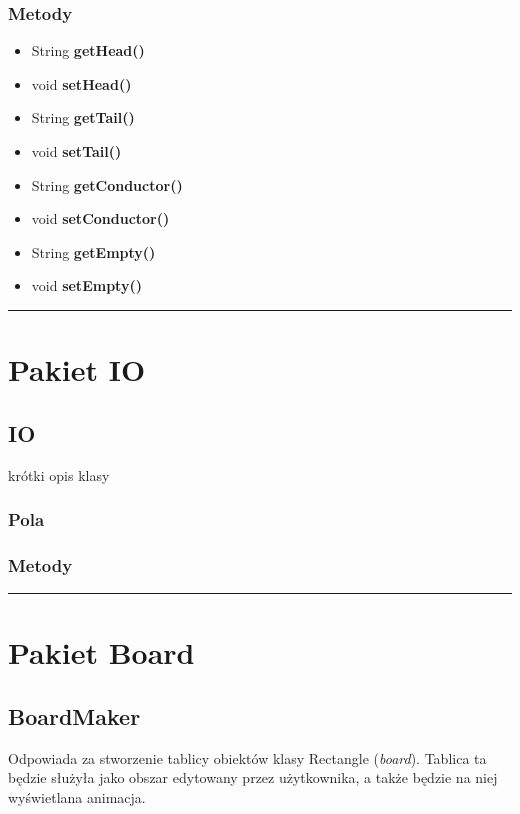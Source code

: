 \documentclass[a4paper,11pt]{article}
\newcommand{\linia}{\rule{\linewidth}{0.4mm}}
\begin{document}
\subsubsection{Metody}
\begin{itemize}
\item String \textbf{getHead()}
\item void \textbf{setHead()}
\item String \textbf{getTail()}
\item void \textbf{setTail()}
\item String \textbf{getConductor()}
\item void \textbf{setConductor()}
\item String \textbf{getEmpty()}
\item void \textbf{setEmpty()}

\end{itemize}
\noindent\linia







\section{Pakiet IO}
\subsection{IO}
krótki opis klasy
\subsubsection{Pola}

\subsubsection{Metody}



\noindent\linia

\section{Pakiet Board}

\subsection{BoardMaker}
Odpowiada za stworzenie tablicy obiektów klasy Rectangle (\textit{board}). Tablica ta będzie służyła jako obszar edytowany przez użytkownika, a także będzie na niej wyświetlana animacja.
\end{document}
